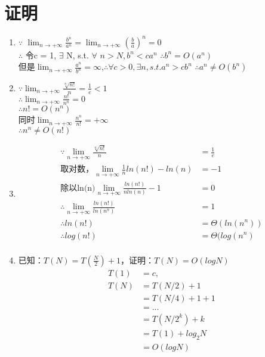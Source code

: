 \documentclass[UTF8]{ctexart}
\begin{document}
\section{证明}%
\begin{enumerate}[1)]

\item
$\because$ $\lim_{n\to +\infty}\frac{b^n}{a^n}={\lim_{n\to +\infty}}(\frac{b}{a})^{n}=0$\\
$\therefore$ 令c = 1, $\exists$ N, s.t. $\forall$ $n>N, b^n<c a^n$
$\therefore b^n=O(a^n)$\\
但是${\lim_{n\to +\infty}}\frac{a^n}{b^n}=\infty$,$\therefore \forall c > 0, \exists n, s.t. a^n>c b^n$
$\therefore a^n \ne O(b^n)$\\

\item
$\because \lim_{n\to +\infty} \frac{\sqrt[n]{n!}}{n} = \frac{1}{e} < 1$\\
$\therefore \lim_{n\to + \infty} \frac{n!}{n^n} = 0$\\
$\therefore n! = O(n^n)$\\
同时${\lim_{n\to + \infty}} \frac{n^n}{n!} = +\infty$\\
$\therefore n^n \ne O(n!)$\\

\item
\begin{align*}
	\because \lim_{n\to + \infty} \frac{\sqrt[n]{n!}}{n} &= \frac{1}{e} \\
	\text{取对数，} \lim_{n\to + \infty} \frac{1}{n} ln(n!)-ln(n) &= -1 \\
	\text{除以ln(n)} \lim_{n\to + \infty} \frac{ln(n!)}{nln(n)} -1 &= 0 \\
	\therefore \lim_{n\to + \infty} \frac{ln(n!)}{ln(n^n)} &= 1\\
	\therefore ln(n!) &= \varTheta(ln(n^n))\\
	\therefore log(n!) &= \varTheta(log(n^n)\\
\end{align*}

\item
已知：$T(N)=T(\frac{N}{2})+1$，证明：$T(N)=O(logN)$\\
\[
\begin{aligned}
T(1)&=c,\\
T(N)&=T(N/2)+1\\
&=T(N/4)+1+1\\
&=...\\
&=T(N/2^k)+k\\
&=T(1)+log_2 N\\
&= O(log N)\\
\end{aligned}
\]

\end{enumerate}
\end{document}
